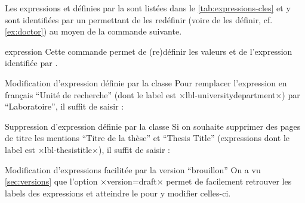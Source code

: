 Les expressions  et  définies par la \yatcl
sont listées dans le \vref{tab:expressions-cles} et y sont identifiées par un
 permettant de les redéfinir (voire de les définir, cf.
\vref{ex:doctor}) au moyen de la commande  suivante.
%
\begin{docCommand}{expression}{}
  Cette commande permet de (re)définir les valeurs  et
   de l'expression identifiée par .
\end{docCommand}

\begin{table}
  \centering
  
  \caption{Expressions de la \yatcl (classées par ordre
    alphabétique de leurs valeurs en français) et labels correspondants}
  \label{tab:expressions-cles}
\end{table}

\begin{dbexample}{Modification d'expression définie par la classe}{}
  Pour remplacer l'expression en français \enquote{Unit\'e de recherche} (dont le label est
  ×lbl-universitydepartment×) par \enquote{Laboratoire}, il suffit de
  saisir :
\begin{preamblecode}[title=Par exemple dans le \File{\configurationfile}]
\end{preamblecode}
\end{dbexample}
%
\begin{dbexample}{Suppression d'expression définie par la classe}{}
  Si on souhaite supprimer des pages de titre les mentions \enquote{Titre de la
    thèse} et \foreignquote{english}{Thesis Title} (expressions dont le label
  est ×lbl-thesistitle×), il suffit de saisir :
\begin{preamblecode}[title=Par exemple dans le \File{\configurationfile}]
\end{preamblecode}
\end{dbexample}

\begin{dbremark}{Modification d'expressions facilitée par la version
    \enquote{brouillon}}{}
  On a vu \vref{sec:versions} que l'option ×version=draft× permet de facilement
  retrouver les labels des expressions et atteindre le \File{\configurationfile}
  pour y modifier celles-ci.
\end{dbremark}

